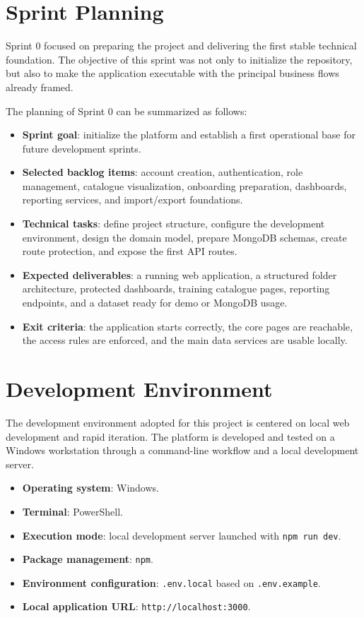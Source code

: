 \section{Sprint Planning}
Sprint 0 focused on preparing the project and delivering the first stable technical foundation. The objective of this sprint was not only to initialize the repository, but also to make the application executable with the principal business flows already framed.

The planning of Sprint 0 can be summarized as follows:

\begin{itemize}
\item \textbf{Sprint goal}: initialize the platform and establish a first operational base for future development sprints.
\item \textbf{Selected backlog items}: account creation, authentication, role management, catalogue visualization, onboarding preparation, dashboards, reporting services, and import/export foundations.
\item \textbf{Technical tasks}: define project structure, configure the development environment, design the domain model, prepare MongoDB schemas, create route protection, and expose the first API routes.
\item \textbf{Expected deliverables}: a running web application, a structured folder architecture, protected dashboards, training catalogue pages, reporting endpoints, and a dataset ready for demo or MongoDB usage.
\item \textbf{Exit criteria}: the application starts correctly, the core pages are reachable, the access rules are enforced, and the main data services are usable locally.
\end{itemize}

\section{Development Environment}
The development environment adopted for this project is centered on local web development and rapid iteration. The platform is developed and tested on a Windows workstation through a command-line workflow and a local development server.

\begin{itemize}
\item \textbf{Operating system}: Windows.
\item \textbf{Terminal}: PowerShell.
\item \textbf{Execution mode}: local development server launched with \texttt{npm run dev}.
\item \textbf{Package management}: \texttt{npm}.
\item \textbf{Environment configuration}: \texttt{.env.local} based on \texttt{.env.example}.
\item \textbf{Local application URL}: \texttt{http://localhost:3000}.
\end{itemize}

